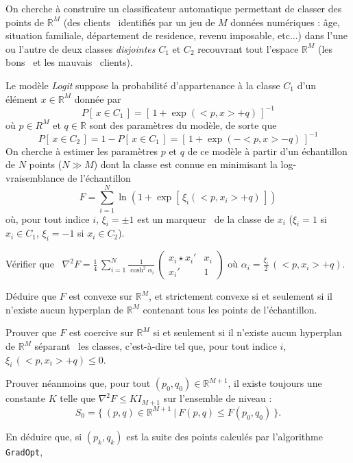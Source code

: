 \documentclass[12pt,a4paper,fleqn]{report}
\newcommand{\R}{\mathbb R}
\newcommand{\hess}{\nabla^2}
\begin{document}
 \begin{exercice}[(scoring)]
 On cherche \`a construire un classificateur automatique permettant de classer des points de $\R^M$ (des \og clients \fg\ identifi\'es par un jeu de $M$ donn\'ees num\'eriques : âge, situation familiale, d\'epartement de residence, revenu imposable, etc...) dans l'une ou l'autre de deux classes \textit{disjointes} $C_1$ et $C_2$ recouvrant tout l'espace $\R^M$ (les \og bons \fg\ et les \og mauvais \fg\ clients).

 Le mod\`ele \textit{Logit} suppose la probabilit\'e d'appartenance \`a la classe $C_1$ d'un \'el\'ement \mbox{$x\in \R^M$} donn\'ee par
\[
P[\,x\in C_1\,]=\left[\,1+\exp (<p,x> +q)\,\right]^{-1}
\]
o\`u \mbox{$p\in R^M$} et \mbox{$q\in \R$} sont des param\`etres du mod\`ele, de sorte que
\[
P[\,x\in C_2\,] =1- P[\,x\in C_1\,] = \left[\,1+\exp (-<p,x> -q)\,\right]^{-1}
\]
On cherche \`a estimer les param\`etres $p$ et $q$ de ce mod\`ele \`a partir d'un \'echantillon de $N$ points ($N\gg M$) dont la classe est connue en minimisant la log-vraisemblance de l'\'echantillon
\[
 F=\sum_{i=1}^N \ln (1+\exp [\,\xi_i(<p,x_i>+q)\,])
\]
o\`u, pour tout indice $i$, $\xi_i=\pm 1$ est un \og marqueur \fg\ de la classe de $x_i$ ($\xi_i=1$ si $x_i\in C_1$, $\xi_i=-1$ si $x_i\in C_2$).
\begin{questions}
\item V\'erifier que
\mbox{ $ \displaystyle
\hess F=\frac{1}{4}\,\sum_{i=1}^N \frac{1}{\cosh^2 \alpha_i}\,\left(\begin{array}{cc} x_i\star x_i' & x_i \\ x_i' & 1 \end{array}\right)
$}
o\`u $\alpha_i=\frac{\xi_i}{2}\,(<p, x_i>+q)$.
\item D\'eduire que $F$ est convexe sur $\R^M$, et strictement convexe si et seulement si il n'existe aucun hyperplan de $\R^M$ contenant tous les points de l'\'echantillon.
\item Prouver que $F$ est coercive sur $\R^M$ si et seulement si il n'existe aucun hyperplan de $\R^M$ \og s\'eparant \fg\ les classes, c'est-\`a-dire tel que, pour tout indice $i$, $\xi_i\,(<p,x_i>+q)\leq 0$.
\item Prouver n\'eanmoins que, pour tout $(p_0,q_0)\in \R^{M+1}$, il existe toujours une constante $K$ telle que $\hess F\leq K I_{M+1}$ sur l'ensemble de niveau :
\[
S_0=\{ \ (p,q)\in \R^{M+1} \ | \ F(p,q)\leq F(p_0,q_0) \ \}.
\]
\item En d\'eduire que, si $(p_k,q_k)$ est la suite des points calcul\'es par l'algorithme \texttt{GradOpt},

\end{questions}
\end{exercice}
\end{document}
